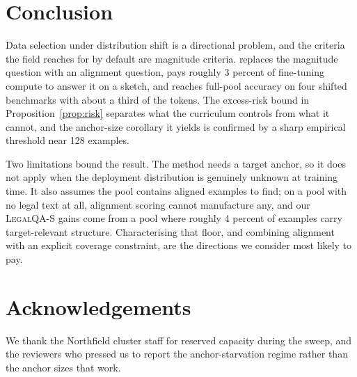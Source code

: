 \section{Conclusion}
\label{sec:conclusion}

Data selection under distribution shift is a directional problem, and the
criteria the field reaches for by default are magnitude criteria. \method{}
replaces the magnitude question with an alignment question, pays roughly 3
percent of fine-tuning compute to answer it on a sketch, and reaches full-pool
accuracy on four shifted benchmarks with about a third of the tokens. The
excess-risk bound in Proposition~\ref{prop:risk} separates what the curriculum
controls from what it cannot, and the anchor-size corollary it yields is
confirmed by a sharp empirical threshold near 128 examples.

Two limitations bound the result. The method needs a target anchor, so it does
not apply when the deployment distribution is genuinely unknown at training
time. It also assumes the pool contains aligned examples to find; on a pool
with no legal text at all, alignment scoring cannot manufacture any, and our
\textsc{LegalQA-S} gains come from a pool where roughly 4 percent of examples
carry target-relevant structure. Characterising that floor, and combining
alignment with an explicit coverage constraint, are the directions we consider
most likely to pay.

\section*{Acknowledgements}
We thank the Northfield cluster staff for reserved capacity during the sweep,
and the reviewers who pressed us to report the anchor-starvation regime rather
than the anchor sizes that work.
